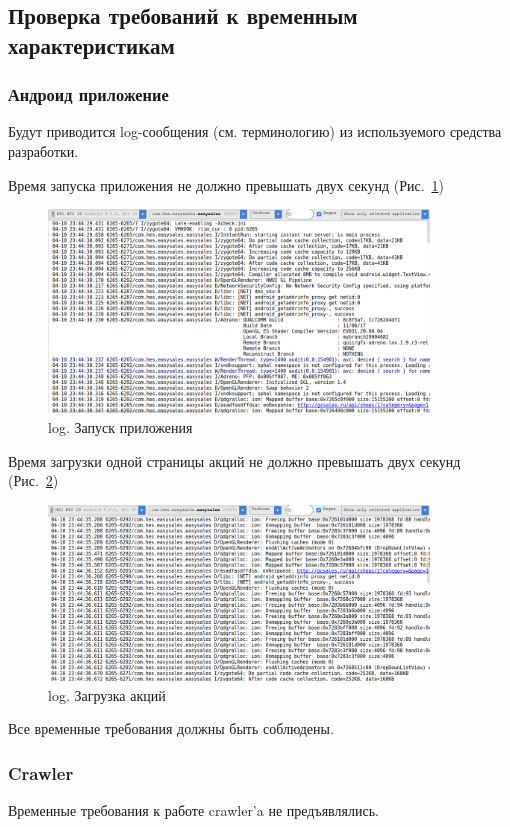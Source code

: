 \newpage
\subsection{Проверка требований к временным характеристикам}
\subsubsection{Андроид приложение}
Будут приводится log-сообщения (см. терминологию) из используемого средства разработки.

Время запуска приложения не должно превышать двух секунд (Рис.~\ref{launch})

\begin{figure}[h!]
    \centering
    \includegraphics[width=0.9\textwidth]{./screenshots/3/lauch_log.png}
    \caption{\small{log. Запуск приложения}}
    \label{launch}
\end{figure}


Время загрузки одной страницы акций не должно превышать двух секунд (Рис.~\ref{loading})

\begin{figure}[h!]
    \centering
    \includegraphics[width=0.9\textwidth]{./screenshots/3/load_log.png}
    \caption{\small{log. Загрузка акций}}
    \label{loading}
\end{figure}
Все временные требования должны быть соблюдены.
\subsubsection{Crawler}
Временные требования к работе crawler'a не предъявлялись.
